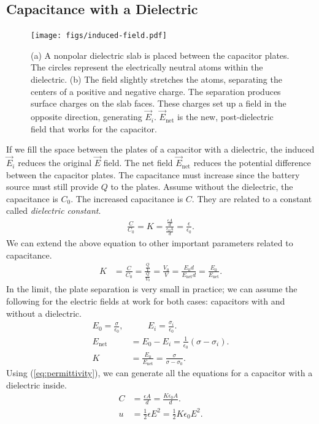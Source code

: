 \documentclass[12pt,b4paper]{article}
\begin{document}
\subsection{Capacitance with a Dielectric}
\begin{figure}[H]
    \centering
    \texttt{[image: figs/induced-field.pdf]}
    \caption{(a) A nonpolar dielectric slab is placed between the capacitor plates. The circles represent the electrically neutral atoms within the dielectric. (b) The field slightly stretches the atoms, separating the centers of a positive and negative charge. The separation produces surface charges on the slab faces. These charges set up a field in the opposite direction, generating $\vec{E}_i$. $\vec{E}_\text{net}$ is the new, post-dielectric field that works for the capacitor.}
    \label{fig:induced-capacitance}
\end{figure}
If we fill the space between the plates of a capacitor with a dielectric, the induced $\vec{E}_i$ reduces the original $\vec{E}$ field. The net field $\vec{E}_\text{net}$ reduces the potential difference between the capacitor plates. The capacitance must increase since the battery source must still provide $Q$ to the plates. Assume without the dielectric, the capacitance is $C_0$. The increased capacitance is $C$. They are related to a constant called \textit{dielectric constant}.
\begin{align}
    \frac{C}{C_0}=K=\frac{\displaystyle\frac{\epsilon A}{d}}{\displaystyle\frac{\epsilon_0 A}{d}}=\frac{\epsilon}{\epsilon_0}.\label{eq:permittivity}
\end{align}
We can extend the above equation to other important parameters related to capacitance.
\begin{align}
    K&=\frac{C}{C_0}=\frac{\displaystyle\frac{Q}{V}}{\displaystyle\frac{Q}{V_0}}=\frac{V_0}{V}=\frac{E_0d}{{E}_\text{net}d}=\frac{E_0}{{E}_\text{net}}.
\end{align}
In the limit, the plate separation is very small in practice; we can assume the following for the electric fields at work for both cases: capacitors with and without a dielectric.
\begin{align}
    E_0=\frac{\sigma}{\epsilon_0},&\qquad E_i=\frac{\sigma_i}{\epsilon_0}.\\
    E_\text{net}&=E_0-E_i=\frac{1}{\epsilon_0}(\sigma-\sigma_i).\\
    K&=\frac{E_0}{{E}_\text{net}}=\frac{\sigma}{\sigma-\sigma_0}.
\end{align}
Using (\ref{eq:permittivity}), we can generate all the equations for a capacitor with a dielectric inside.
\begin{align}
    C&=\frac{\epsilon A}{d}=\frac{K\epsilon_0 A}{d}.\\
    u&=\frac{1}{2}\epsilon E^2=\frac{1}{2}K\epsilon_0E^2.
\end{align}
\end{document}
